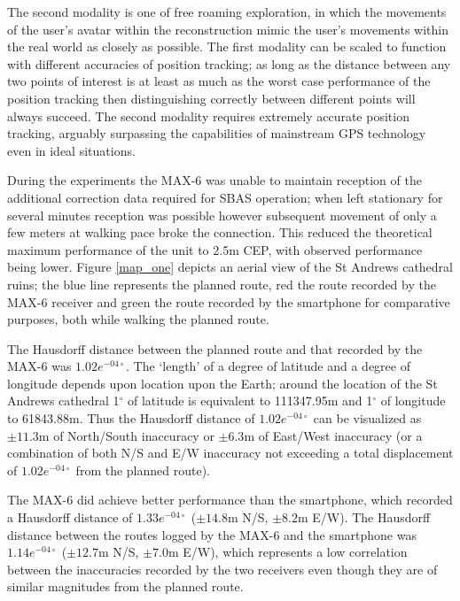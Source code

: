 The second modality is one of free roaming exploration, in which the movements of the user's avatar within the reconstruction mimic the user's movements within the real world as closely as possible.
The first modality can be scaled to function with different accuracies of position tracking; as long as the distance between any two points of interest is at least as much as the worst case performance of the position tracking then distinguishing correctly between different points will always succeed. The second modality requires extremely accurate position tracking, arguably surpassing the capabilities of mainstream GPS technology even in ideal situations.

During the experiments the MAX-6 was unable to maintain reception of the additional correction data required for SBAS operation; when left stationary for several minutes reception was possible however subsequent movement of only a few meters at walking pace broke the connection. This reduced the theoretical maximum performance of the unit to 2.5m CEP, with observed performance being lower. Figure \ref{map_one} depicts an aerial view of the St Andrews cathedral ruins; the blue line represents the planned route, red the route recorded by the MAX-6 receiver and green the route recorded by the smartphone for comparative purposes, both while walking the planned route.


The Hausdorff distance between the planned route and that recorded by the MAX-6 was $1.02e^{-04\circ}$. The `length' of a degree of latitude and a degree of longitude depends upon location upon the Earth; around the location of the St Andrews cathedral 1$^\circ$ of latitude is equivalent to 111347.95m and 1$^\circ$ of longitude to 61843.88m. Thus the Hausdorff distance of $1.02e^{-04\circ}$ can be visualized as $\pm11.3$m of North/South inaccuracy or $\pm6.3$m of East/West inaccuracy (or a combination of both N/S and E/W inaccuracy not exceeding a total displacement of $1.02e^{-04\circ}$ from the planned route).

The MAX-6 did achieve better performance than the smartphone, which recorded a Hausdorff distance of $1.33e^{-04\circ}$ ($\pm14.8$m N/S, $\pm8.2$m E/W). The Hausdorff distance between the routes logged by the MAX-6 and the smartphone was $1.14e^{-04\circ}$ ($\pm12.7$m N/S, $\pm7.0$m E/W), which represents a low correlation between the inaccuracies recorded by the two receivers even though they are of similar magnitudes from the planned route.


